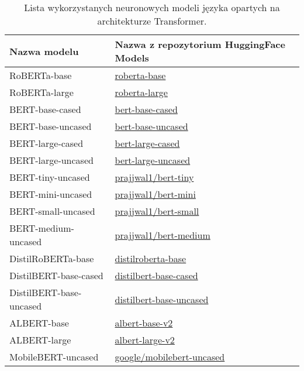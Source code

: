 \begin{longtable}{| l | l |}
\caption{Lista wykorzystanych neuronowych modeli języka opartych na architekturze Transformer.}\label{table:model_information}
    \\  \hline
    \hline
    \textbf{Nazwa modelu} & \textbf{Nazwa z repozytorium HuggingFace Models} \\
    \hline
    RoBERTa-base & \href{https://huggingface.co/roberta-base}{roberta-base} \\
    \hline
    RoBERTa-large & \href{https://huggingface.co/roberta-large}{roberta-large} \\
    \hline
    BERT-base-cased & \href{https://huggingface.co/bert-base-cased}{bert-base-cased} \\
    \hline
    BERT-base-uncased & \href{https://huggingface.co/bert-base-uncased}{bert-base-uncased} \\
    \hline
    BERT-large-cased & \href{https://huggingface.co/bert-large-cased}{bert-large-cased} \\
    \hline
    BERT-large-uncased & \href{https://huggingface.co/bert-large-uncased}{bert-large-uncased} \\
    \hline
    BERT-tiny-uncased & \href{https://huggingface.co/prajjwal1/bert-tiny}{prajjwal1/bert-tiny} \\
    \hline
    BERT-mini-uncased & \href{https://huggingface.co/prajjwal1/bert-mini}{prajjwal1/bert-mini} \\
    \hline
    BERT-small-uncased & \href{https://huggingface.co/prajjwal1/bert-small}{prajjwal1/bert-small} \\
    \hline
    BERT-medium-uncased & \href{https://huggingface.co/prajjwal1/bert-medium}{prajjwal1/bert-medium} \\
    \hline
    DistilRoBERTa-base & \href{https://huggingface.co/distilroberta-base}{distilroberta-base} \\
    \hline
    DistilBERT-base-cased & \href{https://huggingface.co/distilbert-base-cased}{distilbert-base-cased} \\
    \hline
    DistilBERT-base-uncased & \href{https://huggingface.co/distilbert-base-uncased}{distilbert-base-uncased} \\
    \hline
    ALBERT-base & \href{https://huggingface.co/albert-base-v2}{albert-base-v2} \\
    \hline
    ALBERT-large & \href{https://huggingface.co/albert-large-v2}{albert-large-v2} \\
    \hline
    MobileBERT-uncased & \href{https://huggingface.co/google/mobilebert-uncased}{google/mobilebert-uncased} \\

\end{longtable}
